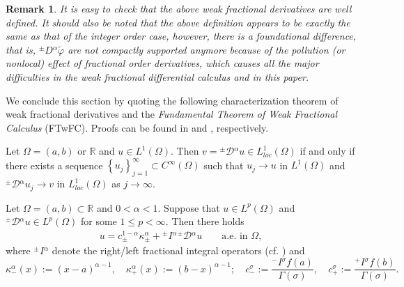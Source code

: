 \documentclass[leqno,final]{siamltex}
\numberwithin{equation}{section}
\newtheorem{remark}{Remark}[section]
\newcommand{\Ome}{{\Omega}}
\renewcommand{\(}{\bigl(}
\renewcommand{\)}{\bigr)}
\newcommand{\R}{\mathbb{R}}
\begin{document}
\begin{remark}
It is easy to check \cite{Feng_Sutton,Feng_Sutton1} that the above weak fractional
derivatives are well defined. It should also be noted that the above definition appears  
to be exactly the same as that of the integer order case, however, there is a foundational
difference, that is, ${^{\pm}}{D}{^{\alpha}} \tilde{\varphi}$ are not 
compactly supported anymore because of the pollution (or nonlocal) effect of fractional 
order derivatives, which causes all the major difficulties in the weak 
fractional differential calculus \cite{Feng_Sutton1} and in this paper. 
\end{remark}

We conclude this section by quoting the following characterization theorem of weak 
fractional derivatives and the \textit{Fundamental Theorem of Weak Fractional Calculus} (FTwFC). Proofs can be found in  \cite[Theorem 4.1 and 4.2]{Feng_Sutton} and \cite[Theorem 4.5]{Feng_Sutton}, respectively. 


\begin{theorem}\label{characterization}
	Let $\Ome=(a,b)$ or $\R$ and $u \in L^{1}(\Omega)$. Then $v = {^{\pm}}{\mathcal{D}}{^{\alpha}} u \in L^{1}_{loc} (\Omega)$ if and only if there exists a sequence $\left\{u_j \right\}_{j=1}^{\infty} \subset C^{\infty} (\Omega)$ such that $u_j \rightarrow u$ in $L^{1}(\Omega)$ and ${^{\pm}}{\mathcal{D}}{^{\alpha}} u_j \rightarrow v$ in $L^{1}_{loc}(\Omega)$ as $j \rightarrow \infty$. 
\end{theorem}

\begin{theorem}\label{FTWFC}
       Let $\Omega=(a,b)\subset \R$ and $0 < \alpha <1$. Suppose that $u \in L^{p}(\Omega)$ and  ${^{\pm}}{\mathcal{D}}{^{\alpha}}u \in L^{p}(\Omega)$ for some $1\leq p < \infty$. Then
       there holds
       \begin{align}\label{WeakFTFC}
           u = c^{1-\alpha}_{\pm} \kappa^{\alpha}_{\pm}  + {^{\pm}}{I}{^{\alpha}}{^{\pm}}{\mathcal{D}}{^{\alpha}} u \qquad
           \mbox{a.e. in } \Omega,
       \end{align}
       where ${^{\pm}}{I}{^{\alpha}}$ denote the right/left fractional integral operators
       (cf. \cite{Samko, Feng_Sutton}) and 
\[          \kappa^{\alpha}_{-}(x) := (x-a)^{\alpha -1}, \quad \kappa^{\alpha}_{+}(x) := (b-x)^{\alpha-1} ;\quad  c_{-}^{\sigma}  := \frac{  {^{-}}{I}{^{\sigma}} f(a) }{\Gamma(\sigma)},\quad
c_{+}^{\sigma} := \frac{   {^{+}}{I}{^{\sigma}} f(b) }{\Gamma(\sigma)}.
\]
  
   \end{theorem}
\end{document}
